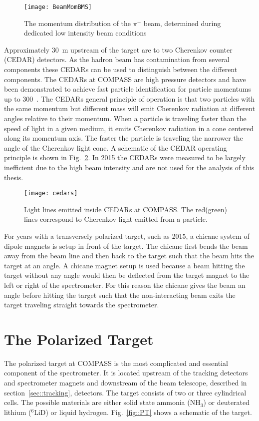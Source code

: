 \begin{figure}[h!t]
  \centering
  \texttt{[image: BeamMomBMS]}
  \caption{The momentum distribution of the $\pi^-$ beam, determined during
    dedicated low intensity beam conditions}
  \label{fig::BeamMomBMS}
\end{figure}

Approximately 30~m upstream of the target are to two Cherenkov counter (CEDAR)
detectors.  As the hadron beam has contamination from several components these
CEDARs can be used to distinguish between the different components.  The CEDARs
at COMPASS are high pressure detectors and have been demonstrated to achieve
fast particle identification for particle momentums up to 300~{\gvc}.  The
CEDARs general principle of operation is that two particles with the same
momentum but different mass will emit Cherenkov radiation at different angles
relative to their momentum.  When a particle is traveling faster than the speed
of light in a given medium, it emits Cherenkov radiation in a cone centered
along its momentum axis.  The faster the particle is traveling the narrower the
angle of the Cherenkov light cone.  A schematic of the CEDAR operating principle
is shown in Fig.~\ref{fig::cedars}.  In 2015 the CEDARs were measured to be
largely inefficient due to the high beam intensity and are not used for the
analysis of this thesis.

\begin{figure}[h!t]
  \centering
  \texttt{[image: cedars]}
  \caption{Light lines emitted inside CEDARs at COMPASS.  The
    red(green) lines correspond to Cherenkov light emitted from a particle.}
  \label{fig::cedars}
\end{figure}

For years with a transversely polarized target, such as 2015, a chicane system
of dipole magnets is setup in front of the target.  The chicane first bends the
beam away from the beam line and then back to the target such that the beam hits
the target at an angle.  A chicane magnet setup is used because a beam hitting
the target without any angle would then be deflected from the target magnet to
the left or right of the spectrometer.  For this reason the chicane gives the
beam an angle before hitting the target such that the non-interacting beam exits
the target traveling straight towards the spectrometer.


\section{The Polarized Target}
The polarized target at COMPASS is the most complicated and essential component
of the spectrometer.  It is located upstream of the tracking detectors and
spectrometer magnets and downstream of the beam telescope, described in
section~\ref{sec::tracking}, detectors.  The target consists of two or three
cylindrical cells.  The possible materials are either solid state ammonia
(NH$_3$) or deuterated lithium ($^6$LiD) or liquid hydrogen. Fig.~\ref{fig::PT}
shows a schematic of the target.  \par

